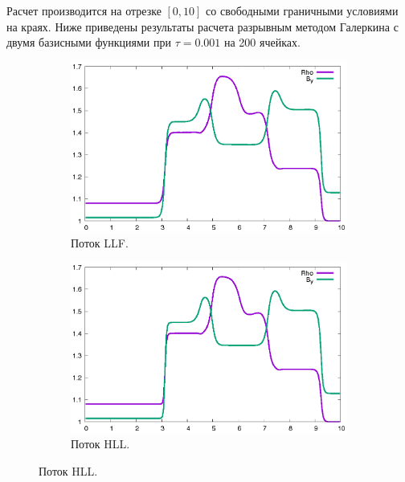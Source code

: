\documentclass[14pt, a4paper, fleqn]{extreport}
\begin{document}
    Расчет производится на отрезке $[0, 10]$ со свободными граничными
    условиями на краях.
    Ниже приведены результаты расчета разрывным методом Галеркина
    с двумя базисными функциями при $\tau = 0.001$ на 200 ячейках.
    \begin{figure}[H]
        \centering
        \caption{$\rho$ и $B_y$ при $t = 1800\tau$.}
        \begin{subfigure}{0.75\textwidth}
            \centering
            \caption{Поток LLF.}
            \includegraphics[width=\textwidth]{1D_LLF.eps}
        \end{subfigure}
        \begin{subfigure}{0.75\textwidth}
            \centering
            \caption{Поток HLL.}
            \includegraphics[width=\textwidth]{1D_HLLE.eps}
        \end{subfigure}
    \end{figure}
\end{document}
